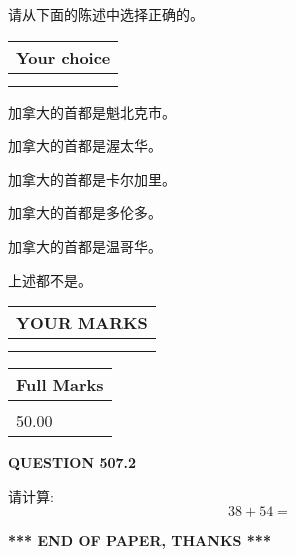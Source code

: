 \documentclass{ctexart}
\begin{document}
  
请从下面的陈述中选择正确的。
  
  
\noindent\hspace{3.0in} \begin{tabular}{|l|}
\hline
Your choice \\
\hline
 \\ 
 \\ 
\hline
\end{tabular}
  
  
 
 
加拿大的首都是魁北克市。
 
 
加拿大的首都是渥太华。
 
 
加拿大的首都是卡尔加里。
 
 
加拿大的首都是多伦多。
 
 
加拿大的首都是温哥华。
 
 
 上述都不是。
 
 
  
\vspace{0.2in}
  
\noindent\begin{tabular}{|l|}
\hline
 YOUR MARKS  \\
\hline
 \\ 
 \\ 
\hline
\end{tabular}
\hspace{0.05in} \begin{tabular}{|l|}
\hline
 Full Marks  \\
\hline
 \\ 
50.00 \\
\hline
\end{tabular}
{\textbf{\Large{QUESTION
507.2 
}}}
  
  
 
请计算:
\begin{equation}
38 +  %
54 = \nonumber
\end{equation}
 

 

 
   
   
 \vspace{0.2in}
 
   
   
   
   
\vspace{1.0in} 
{\textbf{\large{ *** END OF PAPER, THANKS *** }}} 
   
\end{document}
